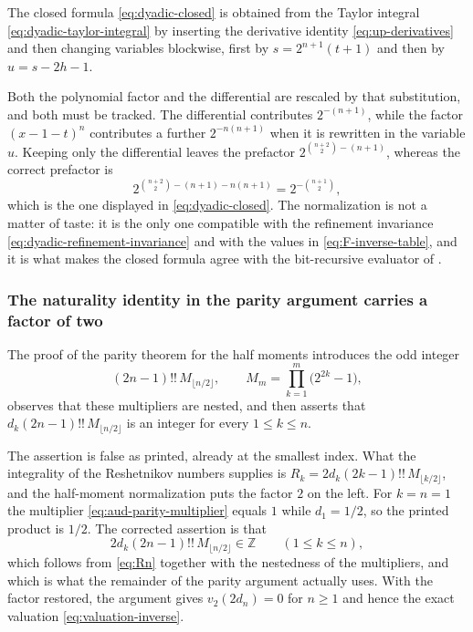 \documentclass[11pt,oneside]{article}
\theoremstyle{definition}
\theoremstyle{remark}
\newcommand{\Z}{\mathbb Z}
\newcommand{\vtwo}{v_2}
\begin{document}
The closed formula \eqref{eq:dyadic-closed} is obtained from the Taylor integral
\eqref{eq:dyadic-taylor-integral} by inserting the derivative identity
\eqref{eq:up-derivatives} and then changing variables blockwise, first by
$s=2^{n+1}(t+1)$ and then by $u=s-2h-1$.

Both the polynomial factor and the differential are rescaled by that substitution, and both
must be tracked.  The differential contributes $2^{-(n+1)}$, while the factor $(x-1-t)^{n}$
contributes a further $2^{-n(n+1)}$ when it is rewritten in the variable $u$.  Keeping only
the differential leaves the prefactor $2^{\binom{n+2}{2}-(n+1)}$, whereas the correct
prefactor is
\begin{equation}
 2^{\binom{n+2}{2}-(n+1)-n(n+1)}=2^{-\binom{n+1}{2}},
                                                          \label{eq:aud-dyadic-normalization}
\end{equation}
which is the one displayed in \eqref{eq:dyadic-closed}.  The normalization is not a matter of
taste: it is the only one compatible with the refinement invariance
\eqref{eq:dyadic-refinement-invariance} and with the values in \eqref{eq:F-inverse-table},
and it is what makes the closed formula agree with the bit-recursive evaluator of
.

\subsubsection{The naturality identity in the parity argument carries a factor of two}

The proof of the parity theorem for the half moments introduces the odd integer
\begin{equation}
 (2n-1)!!\,M_{\lfloor n/2\rfloor},
 \qquad
 M_{m}=\prod_{k=1}^{m}\bigl(2^{2k}-1\bigr),
                                                          \label{eq:aud-parity-multiplier}
\end{equation}
observes that these multipliers are nested, and then asserts that
$d_{k}(2n-1)!!\,M_{\lfloor n/2\rfloor}$ is an integer for every $1\le k\le n$.

The assertion is false as printed, already at the smallest index.  What the integrality of
the Reshetnikov numbers supplies is $R_{k}=2d_{k}(2k-1)!!\,M_{\lfloor k/2\rfloor}$, and the
half-moment normalization puts the factor $2$ on the left.  For $k=n=1$ the multiplier
\eqref{eq:aud-parity-multiplier} equals $1$ while $d_{1}=1/2$, so the printed product is
$1/2$.  The corrected assertion is that
\begin{equation}
 2d_{k}(2n-1)!!\,M_{\lfloor n/2\rfloor}\in\Z
 \qquad(1\le k\le n),                                     \label{eq:aud-naturality-two}
\end{equation}
which follows from \eqref{eq:Rn} together with the nestedness of the multipliers, and which
is what the remainder of the parity argument actually uses.  With the factor restored, the
argument gives $\vtwo(2d_{n})=0$ for $n\ge1$ and hence the exact valuation
\eqref{eq:valuation-inverse}.
\end{document}
